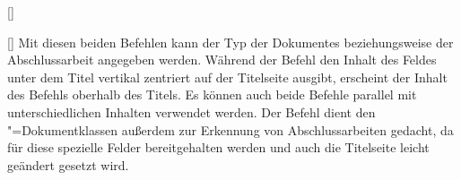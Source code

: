 \begin{Declaration*}{}
\begin{Declaration*}{}
\begin{Declaration*}{}
\begin{Declaration}{[]}
\begin{Declaration}{[]}
\printdeclarationlist%
%
%
%
Mit diesen beiden Befehlen kann der Typ der Dokumentes beziehungsweise der 
Abschlussarbeit angegeben werden. Während der Befehl  den Inhalt 
des Feldes unter dem Titel vertikal zentriert auf der Titelseite ausgibt, 
erscheint der Inhalt des Befehls  oberhalb des Titels. Es können 
auch beide Befehle parallel mit unterschiedlichen Inhalten verwendet werden. 
Der Befehl  dient den \TUDScript"=Dokumentklassen außerdem zur 
Erkennung von Abschlussarbeiten gedacht, da für diese spezielle Felder 
bereitgehalten werden und auch die Titelseite leicht geändert gesetzt wird.


\end{Declaration}
\end{Declaration}
\end{Declaration*}
\end{Declaration*}
\end{Declaration*}
